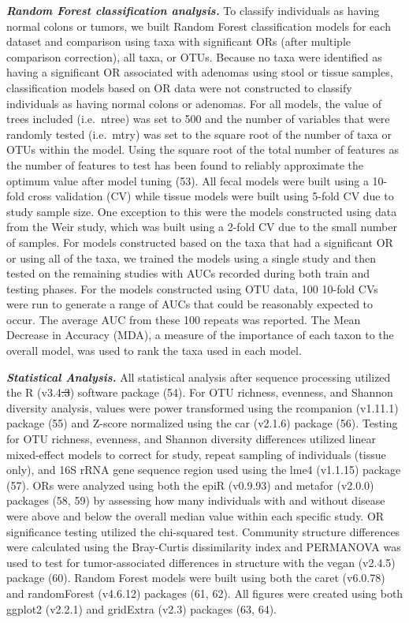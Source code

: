 \documentclass[12pt,]{article}
\providecommand{\DIFaddtex}[1]{{\protect\color{blue}\uwave{#1}}} %
\providecommand{\DIFdeltex}[1]{{\protect\color{red}\sout{#1}}}                      %
\providecommand{\DIFaddbegin}{} %
\providecommand{\DIFaddend}{} %
\providecommand{\DIFdelbegin}{} %
\providecommand{\DIFdelend}{} %
\providecommand{\DIFadd}[1]{\texorpdfstring{\DIFaddtex{#1}}{#1}} %
\providecommand{\DIFdel}[1]{\texorpdfstring{\DIFdeltex{#1}}{}} %
\begin{document}
\textbf{\emph{Random Forest classification analysis.}} To classify
individuals as having normal colons or tumors, we built Random Forest
classification models for each dataset and comparison using taxa with
significant ORs (after multiple comparison correction), all taxa, or
OTUs. Because no taxa were identified as having a significant OR
associated with adenomas using stool or tissue samples, classification
models based on OR data were not constructed to classify individuals as
having normal colons or adenomas. For all models, the value of trees
included (i.e.~ntree) was set to 500 and the number of variables that
were randomly tested (i.e.~mtry) was set to the square root of the
number of taxa or OTUs within the model. Using the square root of the
total number of features as the number of features to test has been
found to reliably approximate the optimum value after model tuning (53).
All fecal models were built using a 10-fold cross validation (CV) while
tissue models were built using 5-fold CV due to study sample size. One
exception to this were the models constructed using data from the Weir
study, which was built using a 2-fold CV due to the small number of
samples. For models constructed based on the taxa that had a significant
OR or using all of the taxa, we trained the models using a single study
and then tested on the remaining studies with AUCs recorded during both
train and testing phases. For the models constructed using OTU data, 100
10-fold CVs were run to generate a range of AUCs that could be
reasonably expected to occur. The average AUC from these 100 repeats was
reported. The Mean Decrease in Accuracy (MDA), a measure of the
importance of each taxon to the overall model, was used to rank the taxa
used in each model.

\textbf{\emph{Statistical Analysis.}} All statistical analysis after
sequence processing utilized the R (v3.4\DIFdelbegin \DIFdel{.3}\DIFdelend \DIFaddbegin \DIFadd{.4}\DIFaddend ) software package (54). For
OTU richness, evenness, and Shannon diversity analysis, values were
power transformed using the rcompanion (v1.11.1) package (55) and
Z-score normalized using the car (v2.1.6) package (56). Testing for OTU
richness, evenness, and Shannon diversity differences utilized linear
mixed-effect models to correct for study, repeat sampling of individuals
(tissue only), and 16S rRNA gene sequence region used using the lme4
(v1.1.15) package (57). ORs were analyzed using both the epiR (v0.9.93)
and metafor (v2.0.0) packages (58, 59) by assessing how many individuals
with and without disease were above and below the overall median value
within each specific study. OR significance testing utilized the
chi-squared test. Community structure differences were calculated using
the Bray-Curtis dissimilarity index and PERMANOVA was used to test for
tumor-associated differences in structure with the vegan (v2.4.5)
package (60). Random Forest models were built using both the caret
(v6.0.78) and randomForest (v4.6.12) packages (61, 62). All figures were
created using both ggplot2 (v2.2.1) and gridExtra (v2.3) packages (63,
64).
\end{document}
